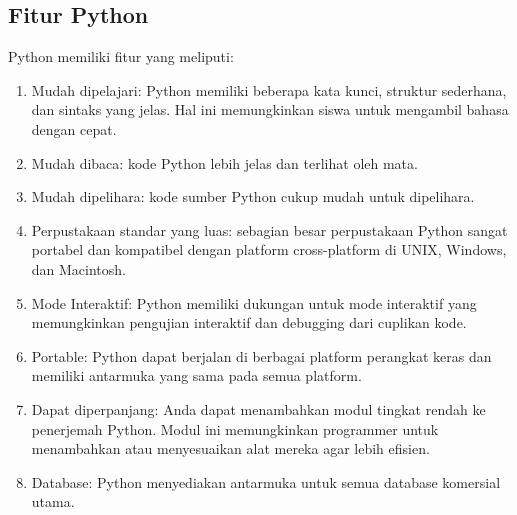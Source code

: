 \subsection{Fitur Python}
Python memiliki fitur yang meliputi:
	\begin{enumerate}
		\item Mudah dipelajari: Python memiliki beberapa kata kunci, struktur sederhana, dan sintaks yang jelas. Hal ini memungkinkan siswa untuk mengambil bahasa dengan cepat.
		\item Mudah dibaca: kode Python lebih jelas dan terlihat oleh mata.
		\item Mudah dipelihara: kode sumber Python cukup mudah untuk dipelihara.
		\item Perpustakaan standar yang luas: sebagian besar perpustakaan Python sangat portabel dan kompatibel dengan platform cross-platform di UNIX, Windows, dan Macintosh. 
		\item Mode Interaktif: Python memiliki dukungan untuk mode interaktif yang memungkinkan pengujian interaktif dan debugging dari cuplikan kode.
		\item Portable: Python dapat berjalan di berbagai platform perangkat keras dan memiliki antarmuka yang sama pada semua platform.
		\item Dapat diperpanjang: Anda dapat menambahkan modul tingkat rendah ke penerjemah Python. Modul ini memungkinkan programmer untuk menambahkan atau menyesuaikan alat mereka agar lebih eﬁsien.
		\item Database: Python menyediakan antarmuka untuk semua database komersial utama. 
	\end{enumerate}

